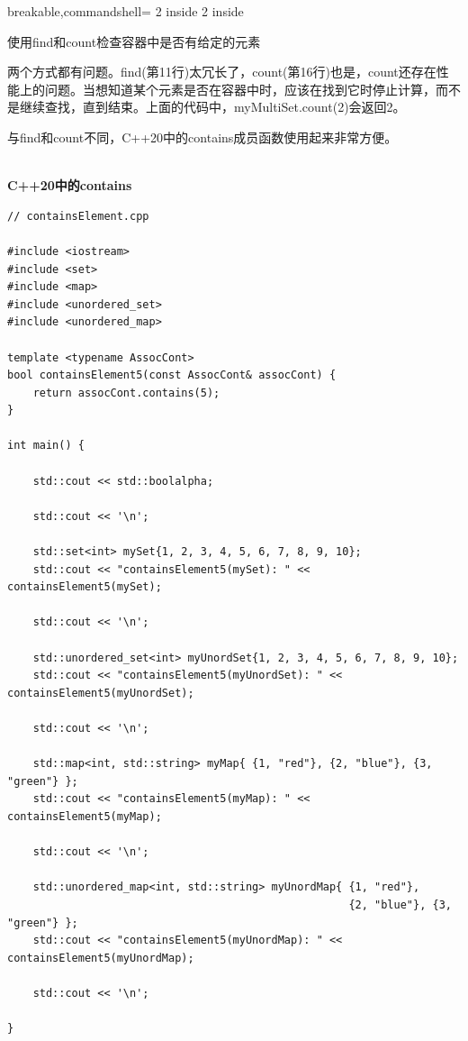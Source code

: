 \begin{tcblisting}{breakable,commandshell={}}
2 inside
2 inside
\end{tcblisting}

\begin{center}
使用find和count检查容器中是否有给定的元素
\end{center}

两个方式都有问题。find(第11行)太冗长了，count(第16行)也是，count还存在性能上的问题。当想知道某个元素是否在容器中时，应该在找到它时停止计算，而不是继续查找，直到结束。上面的代码中，myMultiSet.count(2)会返回2。

与find和count不同，C++20中的contains成员函数使用起来非常方便。

\hspace*{\fill} \\ %
\noindent
\textbf{C++20中的contains}
\begin{lstlisting}[style=styleCXX]
// containsElement.cpp

#include <iostream>
#include <set>
#include <map>
#include <unordered_set>
#include <unordered_map>

template <typename AssocCont>
bool containsElement5(const AssocCont& assocCont) {
	return assocCont.contains(5);
}

int main() {

	std::cout << std::boolalpha;
	
	std::cout << '\n';
	
	std::set<int> mySet{1, 2, 3, 4, 5, 6, 7, 8, 9, 10};
	std::cout << "containsElement5(mySet): " << containsElement5(mySet);
	
	std::cout << '\n';
	
	std::unordered_set<int> myUnordSet{1, 2, 3, 4, 5, 6, 7, 8, 9, 10};
	std::cout << "containsElement5(myUnordSet): " << containsElement5(myUnordSet);
	
	std::cout << '\n';
	
	std::map<int, std::string> myMap{ {1, "red"}, {2, "blue"}, {3, "green"} };
	std::cout << "containsElement5(myMap): " << containsElement5(myMap);
	
	std::cout << '\n';
	
	std::unordered_map<int, std::string> myUnordMap{ {1, "red"},
	                                                 {2, "blue"}, {3, "green"} };
	std::cout << "containsElement5(myUnordMap): " << containsElement5(myUnordMap);
	
	std::cout << '\n';

}
\end{lstlisting}

